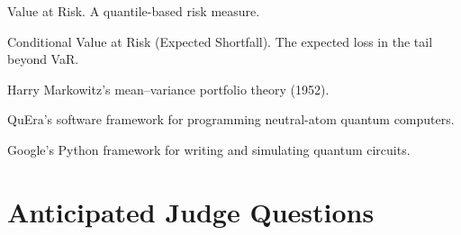 \documentclass[12pt, a4paper]{article}
\begin{document}
\begin{description}[leftmargin=3cm, style=nextline]
    \item[VaR] Value at Risk. A quantile-based risk measure.

    \item[CVaR] Conditional Value at Risk (Expected Shortfall). The expected loss
    in the tail beyond VaR.

    \item[Markowitz] Harry Markowitz's mean--variance portfolio theory (1952).

    \item[Bloqade] QuEra's software framework for programming neutral-atom quantum
    computers.

    \item[Cirq] Google's Python framework for writing and simulating quantum
    circuits.
\end{description}


\section{Anticipated Judge Questions}
\end{document}
